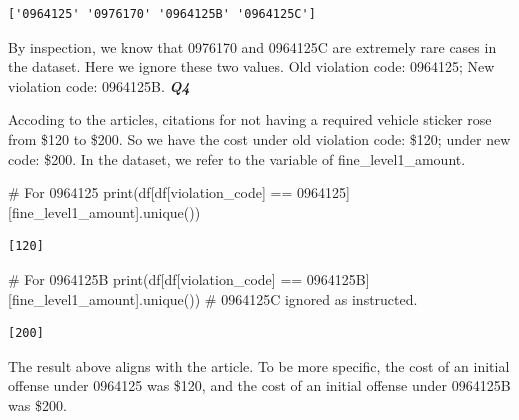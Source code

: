 \documentclass[
  letterpaper,
  DIV=11,
  numbers=noendperiod]{scrartcl}
\newenvironment{Shaded}{\begin{snugshade}}{\end{snugshade}}
\newcommand{\BuiltInTok}[1]{\textcolor[rgb]{0.00,0.23,0.31}{#1}}
\newcommand{\CommentTok}[1]{\textcolor[rgb]{0.37,0.37,0.37}{#1}}
\newcommand{\NormalTok}[1]{\textcolor[rgb]{0.00,0.23,0.31}{#1}}
\newcommand{\OperatorTok}[1]{\textcolor[rgb]{0.37,0.37,0.37}{#1}}
\newcommand{\StringTok}[1]{\textcolor[rgb]{0.13,0.47,0.30}{#1}}
\begin{document}
\begin{verbatim}
['0964125' '0976170' '0964125B' '0964125C']
\end{verbatim}

By inspection, we know that 0976170 and 0964125C are extremely rare
cases in the dataset. Here we ignore these two values. Old violation
code: 0964125; New violation code: 0964125B. \newpage \textbf{\emph{Q4}}

Accoding to the articles, citations for not having a required vehicle
sticker rose from \$120 to \$200. So we have the cost under old
violation code: \$120; under new code: \$200. In the dataset, we refer
to the variable of fine\_level1\_amount.

\begin{Shaded}
\begin{Highlighting}[]
\CommentTok{\# For \textquotesingle{}0964125\textquotesingle{} }
\BuiltInTok{print}\NormalTok{(df[df[}\StringTok{\textquotesingle{}violation\_code\textquotesingle{}}\NormalTok{] }\OperatorTok{==} \StringTok{\textquotesingle{}0964125\textquotesingle{}}\NormalTok{][}\StringTok{\textquotesingle{}fine\_level1\_amount\textquotesingle{}}\NormalTok{].unique())}
\end{Highlighting}
\end{Shaded}

\begin{verbatim}
[120]
\end{verbatim}

\begin{Shaded}
\begin{Highlighting}[]
\CommentTok{\# For \textquotesingle{}0964125B\textquotesingle{} }
\BuiltInTok{print}\NormalTok{(df[df[}\StringTok{\textquotesingle{}violation\_code\textquotesingle{}}\NormalTok{] }\OperatorTok{==} \StringTok{\textquotesingle{}0964125B\textquotesingle{}}\NormalTok{][}\StringTok{\textquotesingle{}fine\_level1\_amount\textquotesingle{}}\NormalTok{].unique())}
\CommentTok{\# \textquotesingle{}0964125C\textquotesingle{} ignored as instructed.}
\end{Highlighting}
\end{Shaded}

\begin{verbatim}
[200]
\end{verbatim}

The result above aligns with the article. To be more specific, the cost
of an initial offense under 0964125 was \$120, and the cost of an
initial offense under 0964125B was \$200.
\end{document}
